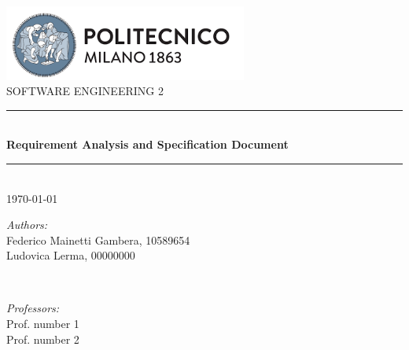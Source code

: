 


        \begin{titlepage}
                \center

                \includegraphics[width=0.6\textwidth]{Images/PolimiLogo.png}\\[1cm]

                \textsc{\Large SOFTWARE ENGINEERING 2}\\[0.2cm]

                \newcommand{\HRule}{\rule{\linewidth}{0.5mm}}
                \HRule \\[0.8cm]
                { \huge \bfseries Requirement Analysis and Specification Document}\\[0.7cm]
                \HRule \\ [0.4cm]

                {\large \today}\\[1.5cm]

                \begin{minipage}{0.59\textwidth}
                        \begin{flushleft} \large
                                \emph{Authors:}\\
                                Federico Mainetti Gambera, 10589654\\
                                Ludovica Lerma, 00000000\\
                        \end{flushleft}
                \end{minipage}
                        ~
                \begin{minipage}{0.39\textwidth}
                        \begin{flushright} \large
                                \emph{Professors:}\\
                                Prof. number 1 \\
                                Prof. number 2 \\
                        \end{flushright}
                \end{minipage}\\[1cm]


\end{titlepage}

